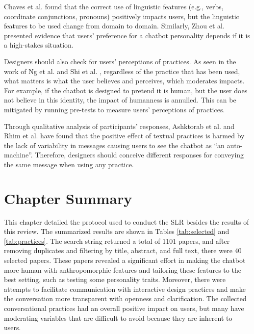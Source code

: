 Chaves et al.  found that the correct use of linguistic features (e.g., verbs, coordinate conjunctions, pronouns) positively impacts users, but the linguistic features to be used change from domain to domain. Similarly, Zhou et al.  presented evidence that users' preference for a chatbot personality depends if it is a high-stakes situation.

Designers should also check for users' perceptions of practices. As seen in the work of Ng et al.  and Shi et al. , regardless of the practice that has been used, what matters is what the user believes and perceives, which moderates impacts. For example, if the chatbot is designed to pretend it is human, but the user does not believe in this identity, the impact of humanness is annulled. This can be mitigated by running pre-tests to measure users' perceptions of practices.

Through qualitative analysis of participants' responses, Ashktorab et al.  and Rhim et al.  have found that the positive effect of textual practices is harmed by the lack of variability in messages causing users to see the chatbot as ``an auto-machine''. Therefore, designers should conceive different responses for conveying the same message when using any practice.


\section{Chapter Summary}

This chapter detailed the protocol used to conduct the \acrshort{SLR} besides the results of this review. The summarized results are shown in Tables \ref{tab:selected} and \ref{tab:practices}. The search string returned a total of 1101 papers, and after removing duplicates and filtering by title, abstract, and full text, there were 40 selected papers. These papers revealed a significant effort in making the chatbot more human with anthropomorphic features and tailoring these features to the best setting, such as testing some personality traits. Moreover, there were attempts to facilitate communication with interactive design practices and make the conversation more transparent with openness and clarification. The collected conversational practices had an overall positive impact on users, but many have moderating variables that are difficult to avoid because they are inherent to users.